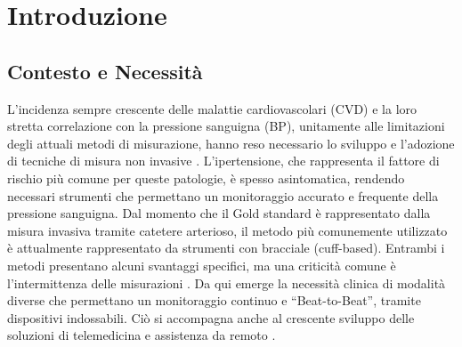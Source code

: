 \documentclass[11pt,a4paper]{article}
\begin{document}



\section{Introduzione}
\label{sec:introduction}
\subsection{Contesto e Necessità}
L’incidenza sempre crescente delle malattie cardiovascolari (CVD) e la loro stretta correlazione con la pressione sanguigna (BP), unitamente alle limitazioni degli attuali metodi di misurazione, hanno reso necessario lo sviluppo e l’adozione di tecniche di misura non invasive \cite{Zhou2023}.
L'ipertensione, che rappresenta il fattore di rischio più comune per queste patologie, è spesso asintomatica, rendendo necessari strumenti che permettano un monitoraggio accurato e frequente della pressione sanguigna. 
Dal momento che il Gold standard è rappresentato dalla misura invasiva tramite catetere arterioso, il metodo più comunemente utilizzato è attualmente rappresentato da strumenti con bracciale (cuff-based). Entrambi i metodi presentano alcuni svantaggi specifici, ma una criticità comune è l'intermittenza delle misurazioni \cite{Zhou2023}. 
Da qui emerge la necessità clinica di modalità diverse che permettano un monitoraggio continuo e “Beat-to-Beat”, tramite dispositivi indossabili. 
Ciò si accompagna anche al crescente sviluppo delle soluzioni di telemedicina e assistenza da remoto \cite{Mukherjee2018}.
\end{document}
